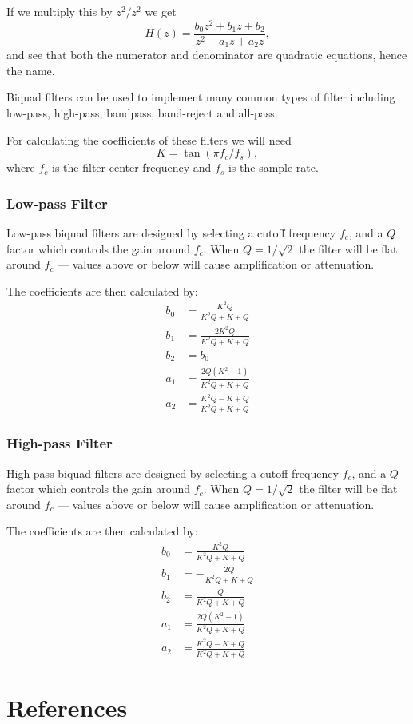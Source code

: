 \documentclass{article}
\begin{document}
If we multiply this by $z^2 / z^2$ we get 
\begin{equation}
    H(z) = \frac{b_0 z^2 + b_1 z + b_2}{z^2 + a_1 z + a_2 z},
\end{equation}
and see that both the numerator and denominator are quadratic equations, hence the name.

Biquad filters can be used to implement many common types of filter including low-pass, high-pass, bandpass, band-reject and all-pass.

For calculating the coefficients of these filters we will need
\begin{equation}
    K = \tan (\pi f_c / f_s),
\end{equation}
where $f_c$ is the filter center frequency and $f_s$ is the sample rate.

\subsubsection{Low-pass Filter}
Low-pass biquad filters are designed by selecting a cutoff frequency $f_c$, and a $Q$ factor which controls the gain around $f_c$.
When $Q = 1/\sqrt 2$ the filter will be flat around $f_c$ --- values above or below will cause amplification or attenuation.

The coefficients are then calculated by:
\begin{align}
    b_0 &= \frac{K^2Q}{K^2Q + K + Q}\\
    b_1 &= \frac{2K^2Q}{K^2Q + K + Q}\\
    b_2 &= b_0\\
    a_1 &= \frac{2Q(K^2 - 1)}{K^2Q + K + Q}\\
    a_2 &= \frac{K^2Q - K + Q}{K^2Q + K + Q}
\end{align}
\cite{Zolzer:2011}

\subsubsection{High-pass Filter}
High-pass biquad filters are designed by selecting a cutoff frequency $f_c$, and a $Q$ factor which controls the gain around $f_c$.
When $Q = 1/\sqrt 2$ the filter will be flat around $f_c$ --- values above or below will cause amplification or attenuation.

The coefficients are then calculated by:
\begin{align}
    b_0 &= \frac{K^2Q}{K^2Q + K + Q}\\
    b_1 &= - \frac{2Q}{K^2Q + K + Q}\\
    b_2 &= \frac{Q}{K^2Q + K + Q}\\
    a_1 &= \frac{2Q(K^2 - 1)}{K^2Q + K + Q}\\
    a_2 &= \frac{K^2Q - K + Q}{K^2Q + K + Q}
\end{align}
\cite{Zolzer:2011}

\section{References}
{}


\printindex
\end{document}
